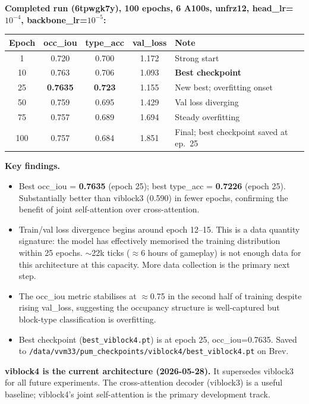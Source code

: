 \documentclass[11pt,a4paper]{article}
\begin{document}
\textbf{Completed run (6tpwgk7y), 100 epochs, 6 A100s, unfrz12, head\_lr=$10^{-4}$, backbone\_lr=$10^{-5}$:}

\begin{center}
\begin{tabular}{ccccl}
\toprule
Epoch & occ\_iou & type\_acc & val\_loss & Note \\
\midrule
1  & 0.720 & 0.700 & 1.172 & Strong start \\
10 & 0.763 & 0.706 & 1.093 & \textbf{Best checkpoint} \\
25 & \textbf{0.7635} & \textbf{0.723} & 1.155 & New best; overfitting onset \\
50 & 0.759 & 0.695 & 1.429 & Val loss diverging \\
75 & 0.757 & 0.689 & 1.694 & Steady overfitting \\
100 & 0.757 & 0.684 & 1.851 & Final; best checkpoint saved at ep.\ 25 \\
\bottomrule
\end{tabular}
\end{center}

\textbf{Key findings.}
\begin{itemize}
  \item Best occ\_iou = \textbf{0.7635} (epoch 25); best type\_acc = \textbf{0.7226} (epoch 25). Substantially better than viblock3 (0.590) in fewer epochs, confirming the benefit of joint self-attention over cross-attention.
  \item Train/val loss divergence begins around epoch 12--15. This is a data quantity signature: the model has effectively memorised the training distribution within 25 epochs. $\sim$22k ticks ($\approx$6 hours of gameplay) is not enough data for this architecture at this capacity. More data collection is the primary next step.
  \item The occ\_iou metric stabilises at $\approx$0.75 in the second half of training despite rising val\_loss, suggesting the occupancy structure is well-captured but block-type classification is overfitting.
  \item Best checkpoint (\texttt{best\_viblock4.pt}) is at epoch 25, occ\_iou=0.7635. Saved to \texttt{/data/vvm33/pum\_checkpoints/viblock4/best\_viblock4.pt} on Brev.
\end{itemize}

\begin{designdecision}
\textbf{viblock4 is the current architecture (2026-05-28).} It supersedes viblock3 for all future experiments. The cross-attention decoder (viblock3) is a useful baseline; viblock4's joint self-attention is the primary development track.
\end{designdecision}
\end{document}
